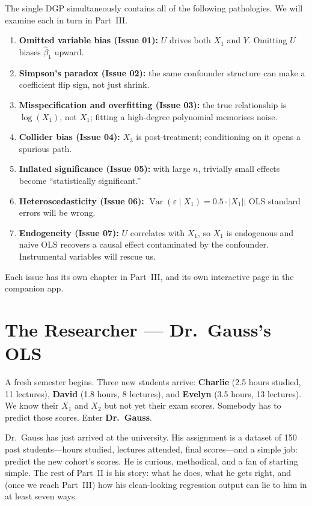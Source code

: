 \documentclass[11pt,a4paper]{article}
\theoremstyle{definition}
\theoremstyle{plain}
\theoremstyle{remark}
\newcommand{\Var}{\operatorname{Var}}
\newcommand{\bhat}{\hat{\beta}}
\begin{document}
The single DGP simultaneously contains all of the following pathologies. We will examine each in turn in Part~III.
\begin{enumerate}[nosep]
  \item \textbf{Omitted variable bias (Issue 01):} $U$ drives both $X_1$ and $Y$. Omitting $U$ biases $\bhat_1$ upward.
  \item \textbf{Simpson's paradox (Issue 02):} the same confounder structure can make a coefficient flip sign, not just shrink.
  \item \textbf{Misspecification and overfitting (Issue 03):} the true relationship is $\log(X_1)$, not $X_1$; fitting a high-degree polynomial memorises noise.
  \item \textbf{Collider bias (Issue 04):} $X_3$ is post-treatment; conditioning on it opens a spurious path.
  \item \textbf{Inflated significance (Issue 05):} with large $n$, trivially small effects become ``statistically significant.''
  \item \textbf{Heteroscedasticity (Issue 06):} $\Var(\varepsilon \mid X_1) = 0.5 \cdot |X_1|$; OLS standard errors will be wrong.
  \item \textbf{Endogeneity (Issue 07):} $U$ correlates with $X_1$, so $X_1$ is endogenous and naive OLS recovers a causal effect contaminated by the confounder. Instrumental variables will rescue us.
\end{enumerate}

Each issue has its own chapter in Part~III, and its own interactive page in the companion app.

\part{The Researcher --- Dr.\ Gauss's OLS}\label{part:gauss}

A fresh semester begins. Three new students arrive: \textbf{Charlie} (2.5 hours studied, 11 lectures), \textbf{David} (1.8 hours, 8 lectures), and \textbf{Evelyn} (3.5 hours, 13 lectures). We know their $X_1$ and $X_2$ but not yet their exam scores. Somebody has to predict those scores. Enter \textbf{Dr.\ Gauss}.

Dr.\ Gauss has just arrived at the university. His assignment is a dataset of 150 past students---hours studied, lectures attended, final scores---and a simple job: predict the new cohort's scores. He is curious, methodical, and a fan of starting simple. The rest of Part~II is his story: what he does, what he gets right, and (once we reach Part~III) how his clean-looking regression output can lie to him in at least seven ways.
\end{document}

